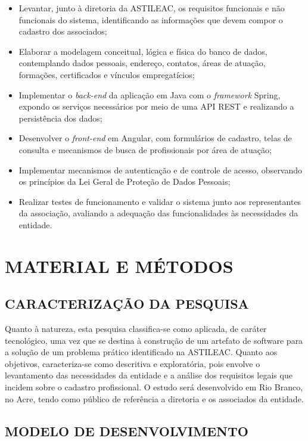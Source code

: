 \documentclass[
        oneside,      %
        english,			
        brazil			 
        ]{abntspiifac}
\begin{document}
\begin{itemize}
    \item Levantar, junto à diretoria da ASTILEAC, os requisitos funcionais e não funcionais do sistema, identificando as informações que devem compor o cadastro dos associados;
    \item Elaborar a modelagem conceitual, lógica e física do banco de dados, contemplando dados pessoais, endereço, contatos, áreas de atuação, formações, certificados e vínculos empregatícios;
    \item Implementar o \textit{back-end} da aplicação em Java com o \textit{framework} Spring, expondo os serviços necessários por meio de uma API REST e realizando a persistência dos dados;
    \item Desenvolver o \textit{front-end} em Angular, com formulários de cadastro, telas de consulta e mecanismos de busca de profissionais por área de atuação;
    \item Implementar mecanismos de autenticação e de controle de acesso, observando os princípios da Lei Geral de Proteção de Dados Pessoais;
    \item Realizar testes de funcionamento e validar o sistema junto aos representantes da associação, avaliando a adequação das funcionalidades às necessidades da entidade.
\end{itemize}


\chapter{MATERIAL E MÉTODOS}

\section{CARACTERIZAÇÃO DA PESQUISA}

Quanto à natureza, esta pesquisa classifica-se como aplicada, de caráter tecnológico, uma vez que se destina à construção de um artefato de software para a solução de um problema prático identificado na ASTILEAC. Quanto aos objetivos, caracteriza-se como descritiva e exploratória, pois envolve o levantamento das necessidades da entidade e a análise dos requisitos legais que incidem sobre o cadastro profissional. O estudo será desenvolvido em Rio Branco, no Acre, tendo como público de referência a diretoria e os associados da entidade.

\section{MODELO DE DESENVOLVIMENTO}
\end{document}
